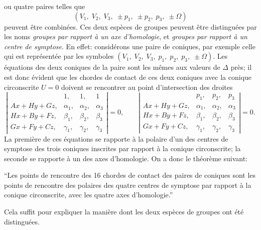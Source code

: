 \documentclass[11pt]{article}
\begin{document}
\noindent ou quatre paires telles que
\[
(V_{1},\;V_{2},\;V_{3},\;\pm p_{1},\;\pm p_{2},\;p_{3},\;\pm\Omega)
\]
peuvent \^etre combin\'ees. Ces deux esp\`eces de groupes peuvent \^etre distingu\'ees par les noms \emph{groupes par rapport \`a un axe d'homologie}, et \emph{groupes par rapport \`a un centre de symptose}. En effet: consid\'erons une paire de coniques, par exemple celle qui est repr\'esent\'ee par les symboles $(V_{1},\;V_{2},\;V_{3},\;p_{1},\;p_{2},\;p_{3},\;\pm\Omega)$. Les \'equations des deux coniques de la paire sont les m\^emes aux valeurs de $\Delta$ pr\`es; il est donc \'evident que les chordes de contact de ces deux coniques avec la conique circonscrite $U = 0$ doivent se rencontrer au point d'intersection des droites
\[
\left|\begin{array}{cccc}
 & 1, & 1, & 1 \\
A x + H y + G z, & \alpha_{1}, & \alpha_{2}, & \alpha_{3} \\
H x + B y + F z, & \beta_{1}, & \beta_{2}, & \beta_{3} \\
G x + F y + C z, & \gamma_{1}, & \gamma_{2}, & \gamma_{3}
\end{array}\right| = 0,\qquad
\left|\begin{array}{cccc}
 & p_{1}, & p_{2}, & p_{3} \\
A x + H y + G z, & \alpha_{1}, & \alpha_{2}, & \alpha_{3} \\
H x + B y + F z, & \beta_{1}, & \beta_{2}, & \beta_{3} \\
G x + F y + C z, & \gamma_{1}, & \gamma_{2}, & \gamma_{3}
\end{array}\right| = 0.
\]
La premi\`ere de ces \'equations se rapporte \`a la polaire d'un des centres de symptose des trois coniques inscrites par rapport \`a la conique circonscrite; la seconde se rapporte \`a un des axes d'homologie. On a donc le th\'eor\`eme suivant:

``Les points de rencontre des 16 chordes de contact des paires de coniques sont les points de rencontre des polaires des quatre centres de symptose par rapport \`a la conique circonscrite, avec les quatre axes d'homologie.''

Cela suffit pour expliquer la mani\`ere dont les deux esp\`eces de groupes ont \'et\'e distingu\'ees.
\end{document}
